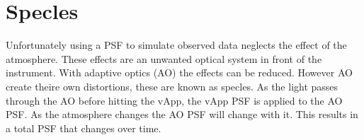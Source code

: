 
\section{Specles}

Unfortunately using a PSF to simulate observed data neglects the effect of the atmosphere. These effects are an unwanted optical system in front of the instrument. With adaptive optics (AO) the effects can be reduced. However AO create theire own distortions, these are known as specles. As the light passes through the AO before hitting the vApp, the vApp PSF is applied to the AO PSF. As the atmosphere changes the AO PSF will change with it. This results in a total PSF that changes over time.

